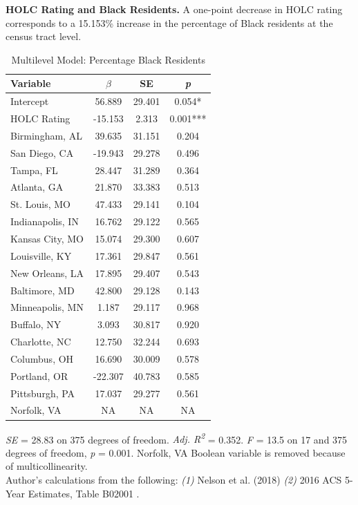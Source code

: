 \documentclass[paper=letter, fontsize=12pt]{scrartcl} %
\begin{document}
	\begin{table}
		\textbf{HOLC Rating and Black Residents.} A one-point decrease in HOLC rating corresponds to a 15.153\% increase in the percentage of Black residents at the census tract level.
		\caption{Multilevel Model: Percentage Black Residents}
		\begin{center}
			\begin{tabular}{|| l | c c c ||}
				\hline
				Variable & $\beta$ & SE & \textit{p}\\
				\hline \hline
				Intercept & 56.889 & 29.401 & 0.054*\\ 
				\hline 
				HOLC Rating & -15.153 & 2.313 & 0.001***\\ 
				\hline 
				Birmingham, AL & 39.635 & 31.151 & 0.204\\ 
				\hline 
				San Diego, CA & -19.943 & 29.278 & 0.496\\ 
				\hline 
				Tampa, FL & 28.447 & 31.289 & 0.364\\ 
				\hline 
				Atlanta, GA & 21.870 & 33.383 & 0.513\\ 
				\hline 
				St. Louis, MO & 47.433 & 29.141 & 0.104\\ 
				\hline 
				Indianapolis, IN & 16.762 & 29.122 & 0.565\\ 
				\hline 
				Kansas City, MO & 15.074 & 29.300 & 0.607\\ 
				\hline 
				Louisville, KY & 17.361 & 29.847 & 0.561\\ 
				\hline 
				New Orleans, LA & 17.895 & 29.407 & 0.543\\ 
				\hline 
				Baltimore, MD & 42.800 & 29.128 & 0.143\\ 
				\hline 
				Minneapolis, MN & 1.187 & 29.117 & 0.968\\ 
				\hline 
				Buffalo, NY & 3.093 & 30.817 & 0.920\\ 
				\hline 
				Charlotte, NC & 12.750 & 32.244 & 0.693\\ 
				\hline 
				Columbus, OH & 16.690 & 30.009 & 0.578\\ 
				\hline 
				Portland, OR & -22.307 & 40.783 & 0.585\\ 
				\hline 
				Pittsburgh, PA & 17.037 & 29.277 & 0.561\\ 
				\hline 
				Norfolk, VA & NA & NA & NA\\ 
				\hline
			\end{tabular}
		\end{center}
		\textit{SE} = 28.83 on 375 degrees of freedom. \textit{Adj. R\textsuperscript{2}} = 0.352. \textit{F} = 13.5 on 17 and 375 degrees of freedom, \textit{p} = 0.001. Norfolk, VA Boolean variable is removed because of multicollinearity.\\
		Author's calculations from the following: \textit{(1)} Nelson et al. (2018) \cite{richmond} \textit{(2)} 2016 ACS 5-Year Estimates, Table B02001 \cite{acs16}.
	\end{table}
	
\end{document}
